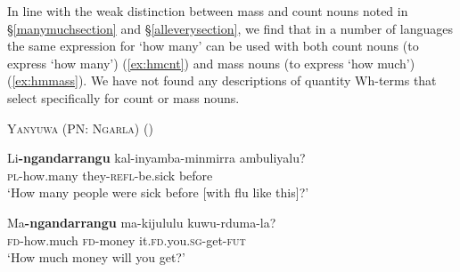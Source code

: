 \documentclass[12pt,egregdoesnotlikesansseriftitles]{scrartcl}
\begin{document}
In line with the weak distinction between mass and count nouns noted in \S\ref{manymuchsection} and \S\ref{alleverysection}, we find that in a number of languages the same expression for `how many' can be used with both count nouns (to express `how many')  (\ref{ex:hmcnt}) and  mass nouns (to express `how much')  (\ref{ex:hmmass}). We have not found any descriptions of quantity Wh-terms that select specifically for count or mass nouns. 
\begin{exe}
\ex \textsc{Yanyuwa (PN: Ngarla)} \hfill (\citealt[27]{kc96})

\begin{xlist}
\ex \gll Li\textbf{-ngandarrangu} kal-inyamba-minmirra ambuliyalu? \\
    \textsc{pl}-how.many     they-\textsc{refl}-be.sick       before\\
    `How many people were sick before [with flu like this]?' \label{ex:hmcnt}
    
\ex \gll Ma\textbf{-ngandarrangu} ma-kijululu kuwu-rduma-la? \\
\textsc{fd}-how.much       \textsc{fd}-money it.\textsc{fd}.you.\textsc{sg}-get-\textsc{fut} \\
`How much money will you get?' \label{ex:hmmass}
\end{xlist}
 
 
  
 

\end{exe}
\end{document}
